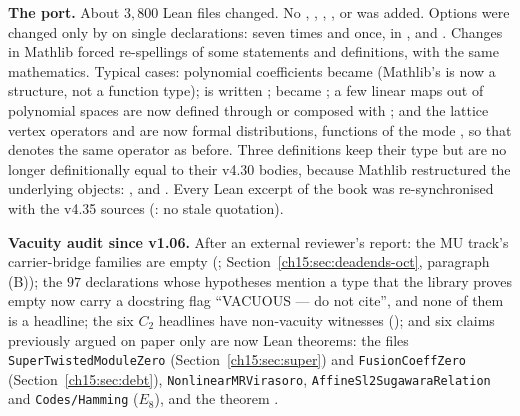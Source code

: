 \begin{status}[title={The release build of v1.1 (Lean v4.35.0-rc3)}]
\textbf{The port.} About $3{,}800$ Lean files changed. No , , ,
,  or  was added. Options were changed only by
 on single declarations:  seven times and
 once, in ,
 and . Changes in Mathlib
forced re-spellings of some statements and definitions, with the same mathematics. Typical cases: polynomial coefficients
 became  (Mathlib's  is now a structure, not a function type);
 is written ;  became
; a few linear maps out of polynomial spaces are now defined through
 or composed with ; and the lattice vertex
operators  and  are now formal distributions, functions of the mode , so that
 denotes the same operator as before. Three definitions keep their type but are no longer definitionally
equal to their v4.30 bodies, because Mathlib restructured the underlying objects: ,
 and . Every Lean excerpt of the book was
re-synchronised with the v4.35 sources (: no stale quotation).

\textbf{Vacuity audit since v1.06.} After an external reviewer's report: the MU track's carrier-bridge families are
empty (; Section~\ref{ch15:sec:deadends-oct}, paragraph (B)); the $97$ declarations
whose hypotheses mention a type that the library proves empty now carry a docstring flag ``VACUOUS --- do not cite'',
and none of them is a headline; the six $C_2$ headlines have non-vacuity witnesses
(); and six claims previously argued on paper only are now Lean
theorems: the files \texttt{SuperTwistedModuleZero} (Section~\ref{ch15:sec:super}) and \texttt{FusionCoeffZero}
(Section~\ref{ch15:sec:debt}), \texttt{NonlinearMRVirasoro}, \texttt{AffineSl2SugawaraRelation} and
\texttt{Codes/Hamming} ($E_8$), and the theorem .
\end{status}


